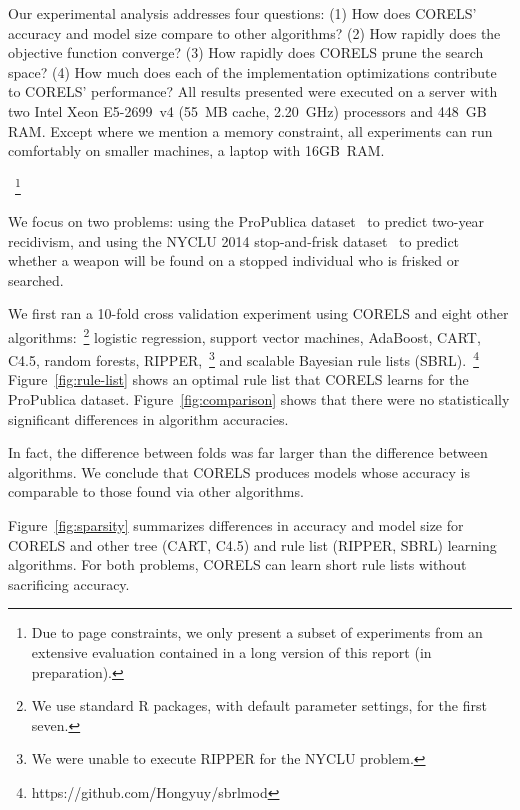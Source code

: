 
Our experimental analysis addresses four questions:
(1) How does CORELS' accuracy and model size compare to other algorithms?
(2) How rapidly does the objective function converge?
(3) How rapidly does CORELS prune the search space?
(4) How much does each of the implementation optimizations contribute to CORELS' performance?
%
All results presented were executed on a server with two Intel Xeon E5-2699~v4
(55~MB cache, 2.20~GHz) processors and 448~GB RAM.
%
Except where we mention a memory constraint, all experiments
can run comfortably on smaller machines, \eg a laptop with 16GB~RAM.\begin{kdd}
~\footnote{Due to page constraints, we only present a subset of experiments from
an extensive evaluation contained in a long version of this report (in preparation).}
\end{kdd}
%
We focus on two problems:
using the ProPublica dataset~\citep{LarsonMaKiAn16} to predict two-year recidivism,
and using the NYCLU 2014 stop-and-frisk dataset~\citep{nyclu:2014} to predict
whether a weapon will be found on a stopped individual who is frisked or searched.

We first ran a 10-fold cross validation experiment using CORELS and eight other
algorithms:~\footnote{We use standard R packages, with default parameter settings, for the first seven.}
logistic regression, support vector machines, AdaBoost, CART, C4.5, random forests, RIPPER,~\footnote{We were unable to execute RIPPER for the NYCLU problem.} and scalable Bayesian rule lists (SBRL).~\footnote{https://github.com/Hongyuy/sbrlmod}
%
Figure~\ref{fig:rule-list} shows an  optimal rule list that CORELS learns
for the ProPublica dataset.
%
Figure~\ref{fig:comparison} shows that there were no statistically significant
differences in algorithm accuracies.
\begin{arxiv}
In fact, the difference between folds was far larger than the difference
between algorithms.
We conclude that CORELS produces models whose accuracy is comparable
to those found via other algorithms.

\end{arxiv}
%
Figure~\ref{fig:sparsity} summarizes differences in accuracy and model size
for CORELS and other tree (CART, C4.5) and rule list (RIPPER, SBRL) learning algorithms.
%
For both problems, CORELS can learn short rule lists without sacrificing accuracy.

